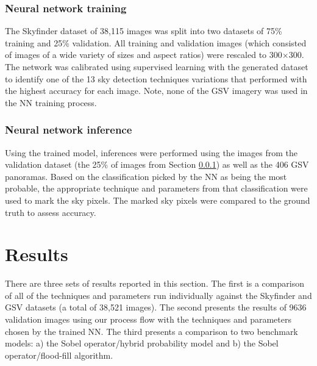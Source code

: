 \documentclass[final,3p,times,authoryear]{elsarticle}
\begin{document}
\subsubsection{Neural network training}\label{sec:nntraining}    

The Skyfinder dataset of 38,115 images was split into two datasets of 75\% training and 25\% validation. All training and validation images (which consisted of images of a wide variety of sizes and aspect ratios) were rescaled to 300$\times$300. The network was calibrated using supervised learning with the generated dataset to identify one of the 13 sky detection techniques variations that performed with the highest accuracy for each image. Note, none of the GSV imagery was used in the NN training process.





\subsubsection{Neural network inference}\label{sec:nninference}    
Using the trained model, inferences were performed using the images from the validation dataset (the 25\% of images from Section \ref{sec:nntraining}) as well as the 406 GSV panoramas. Based on the classification picked by the NN as being the most probable, the appropriate technique and parameters from that classification were used to mark the sky pixels. The marked sky pixels were compared to the ground truth to assess accuracy.



\section{Results}\label{sec:results}


There are three sets of results reported in this section. The first is a comparison of all of the techniques and parameters run individually against the Skyfinder and GSV datasets (a total of 38,521 images). The second presents the results of 9636  validation images using our process flow with the techniques and parameters chosen by the trained NN. The third presents a comparison to two benchmark models: a) the \cite{Wang2015a} Sobel operator/hybrid probability model and b) the \cite{Middel2018} Sobel operator/flood-fill algorithm.
\end{document}
